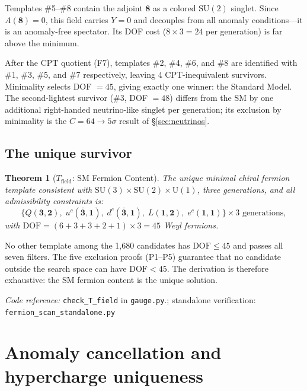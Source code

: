 \documentclass[11pt,a4paper]{article}
\newtheorem{theorem}{Theorem}[section]
\theoremstyle{definition}
\newcommand{\SU}{\mathrm{SU}}
\newcommand{\U}{\mathrm{U}}
\newcommand{\coderef}[2]{\smallskip\noindent\textit{Code reference:} \texttt{#1} in \texttt{#2}.}
\begin{document}
\smallskip\noindent Templates \#5--\#8 contain the adjoint $\mathbf{8}$
as a colored $\SU(2)$ singlet.  Since $A(\mathbf{8}) = 0$, this field
carries $Y = 0$ and decouples from all anomaly conditions---it is an
anomaly-free spectator.  Its DOF cost ($8 \times 3 = 24$ per generation)
is far above the minimum.

\smallskip\noindent After the CPT quotient (F7), templates \#2, \#4,
\#6, and \#8 are identified with \#1, \#3, \#5, and \#7 respectively,
leaving 4 CPT-inequivalent survivors.  Minimality selects DOF $= 45$,
giving exactly one winner: the Standard Model.  The second-lightest
survivor (\#3, DOF $= 48$) differs from the SM by one additional
right-handed neutrino-like singlet per generation;
its exclusion by minimality is the $C = 64 \to 5\sigma$ result of
\S\ref{sec:neutrinos}.


\subsection{The unique survivor}
\label{sec:unique_survivor}

\begin{theorem}[$T_{\mathrm{field}}$: SM Fermion Content]\label{thm:Tfield}
The unique minimal chiral fermion template consistent with
$\SU(3) \times \SU(2) \times \U(1)$, three generations, and all
admissibility constraints is:
\[
  \{Q(\mathbf{3},\mathbf{2}),\;
    u^c(\bar{\mathbf{3}},\mathbf{1}),\;
    d^c(\bar{\mathbf{3}},\mathbf{1}),\;
    L(\mathbf{1},\mathbf{2}),\;
    e^c(\mathbf{1},\mathbf{1})\}
  \times 3 \text{ generations},
\]
with $\mathrm{DOF} = (6+3+3+2+1) \times 3 = 45$ Weyl fermions.
\end{theorem}

\noindent No other template among the 1{,}680 candidates has
$\mathrm{DOF} \le 45$ and passes all seven filters.
The five exclusion proofs (P1--P5) guarantee that no candidate outside
the search space can have $\mathrm{DOF} < 45$.  The derivation is
therefore exhaustive: the SM fermion content is the unique solution.

\coderef{check\_T\_field}{gauge.py}; standalone verification: \texttt{fermion\_scan\_standalone.py}~\cite{BrookeFermionScan}


\newpage


\section{Anomaly cancellation and hypercharge uniqueness}
\label{sec:hypercharge}
\end{document}
